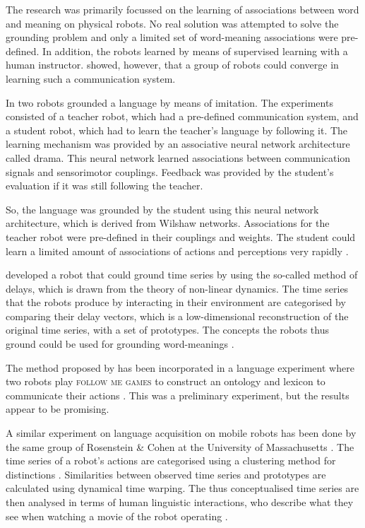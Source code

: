 The research was primarily focussed on the learning of associations between word and meaning on physical robots. No real solution was attempted to solve the grounding problem and only a limited set of word-meaning associations were pre-defined. In addition, the robots learned by means of supervised learning with a human instructor. \citeauthor{yancostein} showed, however, that a group of robots could converge in learning such a communication system.

In \citet{billard:1997a} two robots grounded a language by means of imitation. The experiments consisted of a teacher robot, which had a pre-defined communication system, and a student robot, which had to learn the teacher's language by following it. The learning mechanism was provided by an associative neural network architecture called {\sc drama}. This neural network learned associations between communication signals and sensorimotor couplings. Feedback was provided by the student's evaluation if it was still following the teacher.

So, the language was grounded by the student using this neural network architecture, which is derived from Wilshaw networks. Associations for the teacher robot were pre-defined in their couplings and weights. The student could learn a limited amount of associations of actions and perceptions very rapidly \citep{billard:1998}.


\citet{rosenstein:1998a} developed a robot that could ground time series by using the so-called method of delays, which is drawn from the theory of non-linear dynamics. The time series that the robots produce by interacting in their environment are categorised by comparing their delay vectors, which is a low-dimensional reconstruction of the original time series, with a set of prototypes. The concepts the robots thus ground could be used for grounding word-meanings \citep{rosenstein:1998b}.

The method proposed by \citeauthor{rosenstein:1998a} has been incorporated in a language experiment where two robots play {\scshape follow me games} to construct an ontology and lexicon to communicate their actions \citep{vogt:1999a,vogt:2000}. This was a preliminary experiment, but the results appear to be promising.

A similar experiment on language acquisition on mobile robots has been done by the same group of Rosenstein \& Cohen at the University of Massachusetts \citep{oatesetal:1999}. The time series of a robot's actions are categorised using a clustering method for distinctions \citep{oates:1999}. Similarities between observed time series and prototypes are calculated using dynamical time warping. The thus conceptualised time series are then analysed in terms of human linguistic interactions, who describe what they see when watching a movie of the robot operating \citep{oatesetal:1999}.


